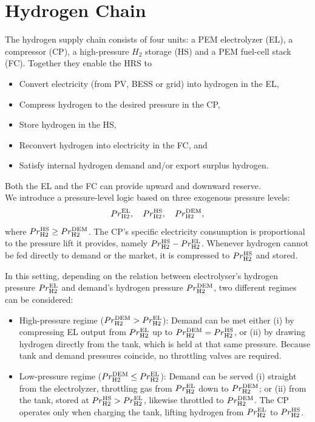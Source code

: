 \documentclass{article}
\begin{document}
\section{Hydrogen Chain}
\label{SEC:HydrogenChain}

The hydrogen supply chain consists of four units: a PEM electrolyzer (EL), a compressor (CP), a high-pressure $H_{2}$ storage (HS) and a PEM fuel-cell stack (FC). Together they enable the HRS to

\begin{itemize}
  \item Convert electricity (from PV, BESS or grid) into hydrogen in the EL,
  \item Compress hydrogen to the desired pressure in the CP,
  \item Store hydrogen in the HS,
  \item Reconvert hydrogen into electricity in the FC, and
  \item Satisfy internal hydrogen demand and/or export surplus hydrogen.
\end{itemize}

Both the EL and the FC can provide upward and downward reserve. \\

We introduce a pressure-level logic based on three exogenous pressure levels:
\[
  Pr^{\rm EL}_{\rm H2},\quad
  Pr^{\rm HS}_{\rm H2},\quad
  Pr^{\rm DEM}_{\rm H2},
\]
where $Pr^{\rm HS}_{\rm H2}\ge Pr^{\rm DEM}_{\rm H2}$. The CP’s specific electricity consumption is proportional to the pressure lift it provides, namely
\(Pr^{\rm HS}_{\rm H2}-Pr^{\rm EL}_{\rm H2}\).
Whenever hydrogen cannot be fed directly to demand or the market, it is compressed to \(Pr^{\rm HS}_{\rm H2}\) and stored.

In this setting, depending on the relation between electrolyser's hydrogen pressure $Pr^{\rm EL}_{\rm H2}$ and demand's hydrogen pressure $Pr^{\rm DEM}_{\rm H2}$, two different regimes can be considered:

\begin{itemize}
    \item High-pressure regime (\(Pr^{\rm DEM}_{\rm H2}>Pr^{\rm EL}_{\rm H2}\)):
    Demand can be met either (i) by compressing EL output from
    \(Pr^{\rm EL}_{\rm H2}\) up to \(Pr^{\rm DEM}_{\rm H2}=Pr^{\rm HS}_{\rm H2}\),
    or (ii) by drawing hydrogen directly from the tank, which is held at that same pressure.
    Because tank and demand pressures coincide, no throttling valves are required.

    \item Low-pressure regime (\(Pr^{\rm DEM}_{\rm H2}\le Pr^{\rm EL}_{\rm H2}\)):
    Demand can be served (i) straight from the electrolyzer, throttling gas from
    \(Pr^{\rm EL}_{\rm H2}\) down to \(Pr^{\rm DEM}_{\rm H2}\); or
    (ii) from the tank, stored at \(Pr^{\rm HS}_{\rm H2}>Pr^{\rm EL}_{\rm H2}\), likewise throttled to
    \(Pr^{\rm DEM}_{\rm H2}\).
    The CP operates only when charging the tank, lifting hydrogen from
    \(Pr^{\rm EL}_{\rm H2}\) to \(Pr^{\rm HS}_{\rm H2}\).
\end{itemize}
\end{document}
